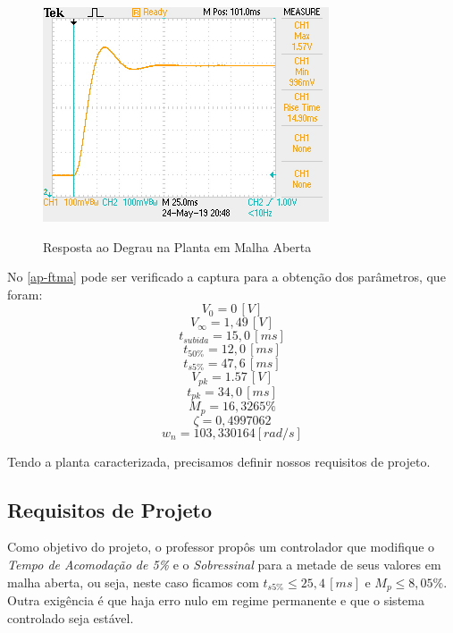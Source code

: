 \documentclass[
	12pt,				%
	article,			%
	openright,			%
	oneside,
	a4paper,			%
	chapter=TITLE,		%
	section=TITLE,		%
	english,			%
	french,				%
	spanish,			%
	brazil,				%
]{abntex2}
\begin{document}
            \begin{figure}[htbp]
            	\centering
            	\caption{Resposta ao Degrau na Planta em Malha Aberta}
            	\includegraphics[width=\textwidth,height=240px,keepaspectratio]{imgs/ftma/step_response.JPG}
            	\label{fig-ftma-step}
        	\end{figure}
            
            No \ref{ap-ftma} pode ser verificado a captura para a obtenção dos parâmetros, que foram:
            \FloatBarrier
                $$V_{0}=0\,[V]$$
                $$V_{\infty}=1,49\,[V]$$
                $$t_{subida}=15,0\,[ms]$$
                $$t_{50\%}=12,0\,[ms]$$
                $$t_{s5\%}=47,6\,[ms]$$
                $$V_{pk}=1.57\,[V]$$
                $$t_{pk}=34,0\,[ms]$$
                $$M_{p}=16,3265\%$$
                $$\zeta = 0,4997062 $$
                $$w_n = 103,330164 [rad/s]$$
            \FloatBarrier
            
            Tendo a planta caracterizada, precisamos definir nossos requisitos de projeto.
        
        \subsection{Requisitos de Projeto}
        
            Como objetivo do projeto, o professor propôs um controlador que modifique o \textit{Tempo de Acomodação de 5\%} e o \textit{Sobressinal} para a metade de seus valores em malha aberta, ou seja, neste caso ficamos com $t_{s5\%}\leq25,4\,[ms]$ e $M_{p}\leq8,05\%$. Outra exigência é que haja erro nulo em regime permanente e que o sistema controlado seja estável.
\end{document}
